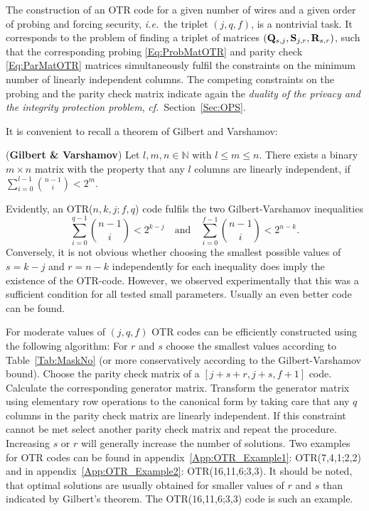 \documentclass[11pt]{llncs}
\newcommand{\ie}{{\it i.e.\ }}
\newcommand{\cf}{{\it cf.\ }}
\begin{document}
The construction of an OTR code for a given number of wires
and a given order of probing and forcing security,
\ie the triplet $(j,q,f)$, is a nontrivial task.
It corresponds to the problem of finding
a triplet of matrices $(\mathbf{Q}_{s,j}, \mathbf{S}_{j,r}, \mathbf{R}_{s,r})$, such that
the corresponding probing \eqref{Eq:ProbMatOTR}
and parity check \eqref{Eq:ParMatOTR} matrices
simultaneously fulfil the constraints on
the minimum number of linearly independent columns.
The competing constraints on the probing and the parity check matrix
indicate again the \emph{duality of the privacy and
the integrity protection problem}, \cf Section~\ref{Sec:OPS}.

It is convenient to recall a theorem of Gilbert and Varshamov:
\begin{theorem} (\textbf{Gilbert \& Varshamov})
Let $l,m,n \in \mathds{N}$ with $l\le m\le n$.
There exists a binary $m\times n$ matrix with the property
that any $l$ columns are linearly independent,
if\,\,\,\,$\sum_{i=0}^{l-1}\binom{n-1}{i} < 2^m$.
\end{theorem}
Evidently, an OTR($n,k,j;f,q$) code fulfils the two Gilbert-Varshamov inequalities
\[
    \sum_{i=0}^{q-1} \binom{n-1}{i} < 2^{k-j}
        \quad\textrm{and}\quad
    \sum_{i=0}^{f-1} \binom{n-1}{i} < 2^{n-k}.
\]
Conversely, it is not obvious whether choosing the smallest
possible values of $s=k-j$ and $r=n-k$ independently
for each inequality does imply the existence of the OTR-code.
However, we observed experimentally that this was a sufficient condition
for all tested small parameters. Usually an even better code can be found.

For moderate values of $(j,q,f)$ OTR codes can
be efficiently constructed
using the following algorithm:
For $r$ and $s$ choose the smallest values according to Table~\ref{Tab:MaskNo}
(or more conservatively according to the Gilbert-Varshamov bound).
Choose the parity check matrix of a $[j+s+r,j+s,f+1]$ code.
Calculate the corresponding generator matrix.
Transform the generator matrix using elementary row operations
to the canonical form by taking care that any $q$ columns in
the parity check matrix are linearly independent.
If this constraint cannot be met
select another parity check matrix
and repeat the procedure. Increasing $s$ or $r$ will generally
increase the number of solutions.
Two examples for OTR codes
can be found
in appendix~\ref{App:OTR_Example1}: OTR(7,4,1;2,2) and
in appendix~\ref{App:OTR_Example2}: OTR(16,11,6;3,3).
It should be noted, that optimal solutions are usually
obtained for smaller values of $r$ and $s$ than indicated by Gilbert's theorem.
The OTR(16,11,6;3,3) code is such an example.
\end{document}
